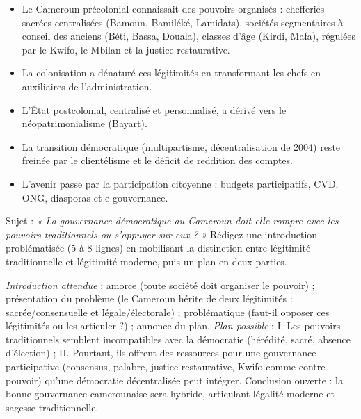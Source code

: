 \documentclass[11pt]{article}
\newcommand{\cle}[1]{{\popxbold\color{popdark}#1}}
\begin{document}
\begin{aretenir}
\begin{itemize}
\item Le Cameroun précolonial connaissait des pouvoirs organisés : chefferies sacrées centralisées (Bamoun, Bamiléké, Lamidats), sociétés segmentaires à conseil des anciens (Béti, Bassa, Douala), classes d'âge (Kirdi, Mafa), régulées par le Kwifo, le Mbilan et la justice restaurative.
\item La colonisation a dénaturé ces légitimités en transformant les chefs en auxiliaires de l'administration.
\item L'État postcolonial, centralisé et personnalisé, a dérivé vers le \cle{néopatrimonialisme} (Bayart).
\item La transition démocratique (multipartisme, décentralisation de 2004) reste freinée par le clientélisme et le déficit de reddition des comptes.
\item L'avenir passe par la participation citoyenne : budgets participatifs, CVD, ONG, diasporas et e-gouvernance.
\end{itemize}
\end{aretenir}

\begin{exercice}
Sujet : \emph{« La gouvernance démocratique au Cameroun doit-elle rompre avec les pouvoirs traditionnels ou s'appuyer sur eux ? »} Rédigez une introduction problématisée (5 à 8 lignes) en mobilisant la distinction entre légitimité traditionnelle et légitimité moderne, puis un plan en deux parties.
\end{exercice}

\begin{corrige}[Exercice 1]
\emph{Introduction attendue} : amorce (toute société doit organiser le pouvoir) ; présentation du problème (le Cameroun hérite de deux légitimités : sacrée/consensuelle et légale/électorale) ; problématique (faut-il opposer ces légitimités ou les articuler ?) ; annonce du plan. \emph{Plan possible} : I. Les pouvoirs traditionnels semblent incompatibles avec la démocratie (hérédité, sacré, absence d'élection) ; II. Pourtant, ils offrent des ressources pour une gouvernance participative (consensus, palabre, justice restaurative, Kwifo comme contre-pouvoir) qu'une démocratie décentralisée peut intégrer. Conclusion ouverte : la bonne gouvernance camerounaise sera hybride, articulant légalité moderne et sagesse traditionnelle.
\end{corrige}
\end{document}
